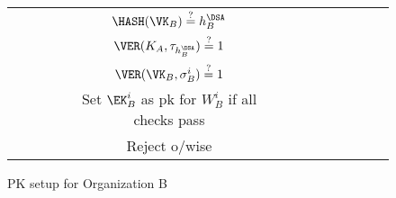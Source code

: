 \begin{sidewaysfigure}
\begin{table}[H]
\begin{adjustbox}{width=\textwidth}
\begin{tabular}{c c c c c c c c c c c c c}
&&&& $\HASH(\VK_B) \stackrel{?}{=} h_B^\DSA$ \\
&&&& $\VER(K_A, \tau_{h_B^\DSA}) \stackrel{?}{=} 1$ \\
&&&& $\VER(\VK_B, \sigma^i_B) \stackrel{?}{=} 1$ \\
&&&& Set $\EK_B^i$ as pk for $W_B^i$ if all checks pass \\
&&&& Reject o/wise \\


\end{tabular}
\end{adjustbox}
\end{table}
\caption{PK setup for Organization B}
\label{fig:b-flow}
\end{sidewaysfigure}


